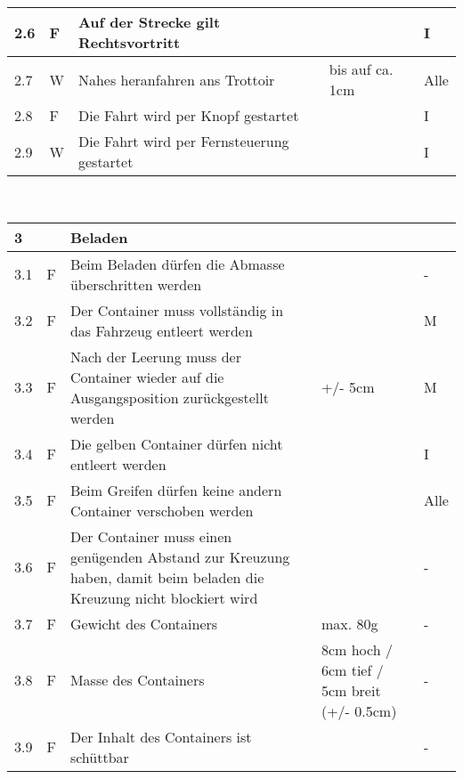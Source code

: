 \begin{center}
\begin{tabular}{|p{1cm}|p{0.5cm}|p{5cm}|p{5cm}|p{1.5cm}|}
 2.6 & F & Auf der Strecke gilt Rechtsvortritt & & I \\\hline
 2.7 & W & Nahes heranfahren ans Trottoir & bis auf ca. 1cm & Alle\\\hline
 2.8 & F & Die Fahrt wird per Knopf gestartet & & I\\\hline
 2.9 & W & Die Fahrt wird per Fernsteuerung gestartet & & I \\\hline
\end{tabular}\\[0.3cm]
\begin{tabular}{|p{1cm}|p{0.5cm}|p{5cm}|p{5cm}|p{1.5cm}|}\hline
 \textbf{3} & & \textbf{Beladen} & & \\\hline
 3.1 & F & Beim Beladen dürfen die Abmasse überschritten werden & & -\\\hline
 3.2 & F & Der Container muss vollständig in das Fahrzeug entleert werden & & M\\\hline
 3.3 & F & Nach der Leerung muss der Container wieder auf die Ausgangsposition zurückgestellt werden & +/- 5cm & M\\\hline
 3.4 & F & Die gelben Container dürfen nicht entleert werden & & I\\\hline
 3.5 & F & Beim Greifen dürfen keine andern Container verschoben werden & & Alle\\\hline
 3.6 & F & Der Container muss einen genügenden Abstand zur Kreuzung haben, damit beim beladen die Kreuzung nicht blockiert wird & & - \\\hline 
 3.7 & F & Gewicht des Containers & max. 80g & - \\\hline 
 3.8 & F & Masse des Containers& 8cm hoch  / 6cm tief / 5cm breit (+/- 0.5cm) & - \\\hline 
 3.9 & F & Der Inhalt des Containers ist schüttbar &  & - \\\hline 
\end{tabular}
\end{center}
